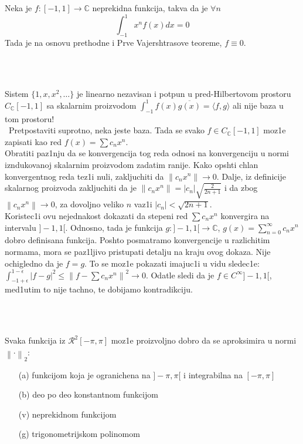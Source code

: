 \documentclass[a4paper,12pt]{article}
\newcommand{\CC}{\mathbb{C}}
\newcommand{\norm}[1]{\left\lVert#1\right\rVert}
\begin{document}
\begin{pr}
Neka je $f:[-1,1] \to \CC$ neprekidna funkcija, takva da je $\forall n$ 
\[\int_{-1}^1 x^n f(x) dx = 0\]
Tada je na osnovu prethodne i Prve Vajershtrasove teoreme, $f\equiv 0$.
\end{pr}
\\ \\
\begin{pr}
Sistem $\{1, x, x^2, \dots \}$ je linearno nezavisan i potpun u pred-Hilbertovom pro\-sto\-ru $C_{\CC}[-1,1]$ sa skalarnim proizvodom $\int_{-1}^1 f(x)\overline{g(x)} = \langle f, g \rangle$ ali nije baza u tom prostoru! \\ \ Pretpostaviti suprotno, neka jeste baza. Tada se svako $f \in C_{\CC}[-1,1]$ moz1e zapisati kao red $f(x) = \sum c_n x^n$. \\ Obratiti paz1nju da se konvergencija tog reda odnosi na konvergenciju u normi iznduko\-va\-noj skalarnim proizvodom zadatim ranije. Kako opshti chlan konvergentnog reda tez1i nuli, zakljuchiti da $\norm{c_n x^n} \to 0$. Dalje, iz definicije skalarnog proizvoda zakljuchiti da je $\norm{c_n x^n} = |c_n| \sqrt{\frac{2}{2n+1}}$ i da zbog $\norm{c_n x^n} \to 0$, za dovoljno veliko $n$ vaz1i $|c_n| < \sqrt{2n+1}$. \\ Koristec1i ovu nejednakost dokazati da stepeni red $\sum c_n x^n$ konvergira na intervalu $]-1, 1[$. Odnosno, tada je funkcija $g: ]-1, 1[ \to \CC$, $g(x) = \sum_{n=0}^{\infty} c_n x^n$ dobro definisana funkcija. Poshto posmatramo konvergencije u razlichitim normama, mora se paz1ljivo pristupati detalju na kraju ovog dokaza. Nije ochigledno da je $f = g$. To se moz1e pokazati imajuc1i u vidu sledec1e: $\int_{-1 + \epsilon}^{1 - \epsilon} {|f-g|}^2 \leq {\norm{f - \sum c_n x^n}}^2 \to 0$. Odatle sledi da je $f \in C^{\infty}]-1, 1[$, med1utim to nije tachno, te dobijamo kontradikciju.
\end{pr}
\\ \\
\begin{tma}
	Svaka funkcija iz $\mathcal R ^2[-\pi, \pi]$ moz1e proizvoljno dobro da se aproksimira u normi $\norm{\cdot}_2$:
\begin{itemize}
\item[(a)] funkcijom koja je ogranichena na $]- \pi, \pi[$ i integrabilna na $[-\pi, \pi]$
\item[(b)] deo po deo konstantnom funkcijom
\item[(v)] neprekidnom funkcijom
\item[(g)] trigonometrijskom polinomom
\end{itemize}
\end{tma}
\end{document}
